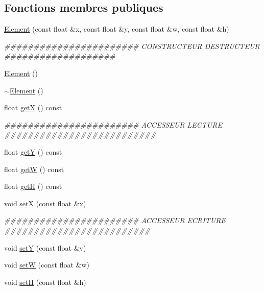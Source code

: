 \subsection*{Fonctions membres publiques}
\begin{DoxyCompactItemize}
\item 
\hyperlink{classElement_a77002f3835d2e63182b42006bff8f273}{Element} (const float \&x, const float \&y, const float \&w, const float \&h)
\begin{DoxyCompactList}\small\item\em \#\#\#\#\#\#\#\#\#\#\#\#\#\#\#\#\#\#\#\#\#\#\# CONSTRUCTEUR DESTRUCTEUR \#\#\#\#\#\#\#\#\#\#\#\#\#\#\#\#\#\#\# \end{DoxyCompactList}\item 
\hyperlink{classElement_ab0d0e20be9a36ae676202db753faeec9}{Element} ()
\item 
\hyperlink{classElement_a13d54ba9c08b6bec651402f1c2bb002c}{$\sim$Element} ()
\item 
float \hyperlink{classElement_a4f55ac6c691d1805b0184f946e052ab8}{getX} () const 
\begin{DoxyCompactList}\small\item\em \#\#\#\#\#\#\#\#\#\#\#\#\#\#\#\#\#\#\#\#\#\#\# ACCESSEUR LECTURE \#\#\#\#\#\#\#\#\#\#\#\#\#\#\#\#\#\#\#\#\#\#\#\#\#\# \end{DoxyCompactList}\item 
float \hyperlink{classElement_af64be35116ee30893aed1082af5becda}{getY} () const 
\item 
float \hyperlink{classElement_a2129d23b56422180cdd4dc24c1316aaf}{getW} () const 
\item 
float \hyperlink{classElement_a947b0f7cbb4f1c9350557fb522a9dc72}{getH} () const 
\item 
void \hyperlink{classElement_a27b9c0d865d6d5b4385916d1d6796e48}{setX} (const float \&x)
\begin{DoxyCompactList}\small\item\em \#\#\#\#\#\#\#\#\#\#\#\#\#\#\#\#\#\#\#\#\#\#\# ACCESSEUR ECRITURE \#\#\#\#\#\#\#\#\#\#\#\#\#\#\#\#\#\#\#\#\#\#\#\#\# \end{DoxyCompactList}\item 
void \hyperlink{classElement_aab521371f98cd2a75bb070ab943bc423}{setY} (const float \&y)
\item 
void \hyperlink{classElement_af7e78cfc3065616af3afde280e842e9a}{setW} (const float \&w)
\item 
void \hyperlink{classElement_ad540efa7d6571a383cdbdbe309284b9d}{setH} (const float \&h)
\end{DoxyCompactItemize}
